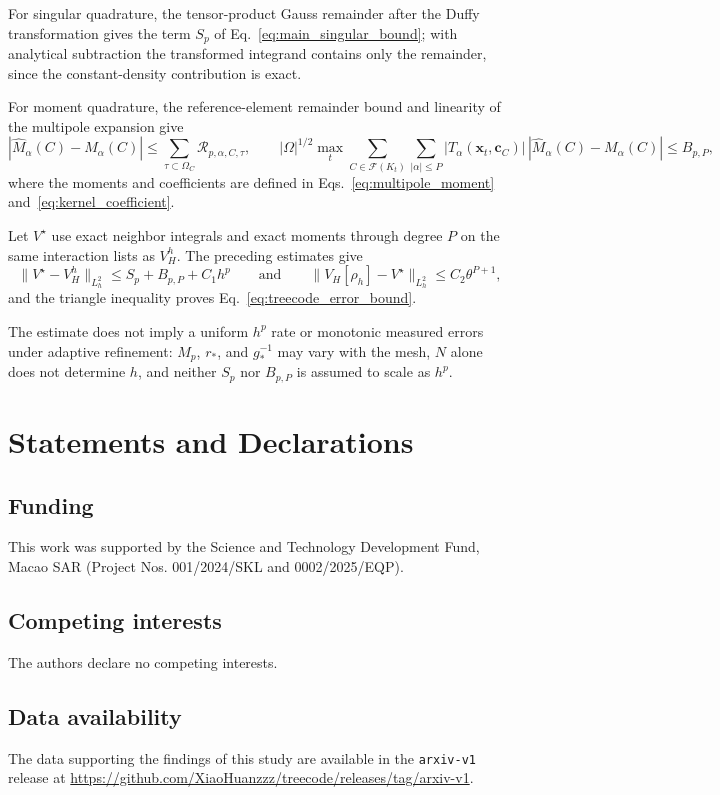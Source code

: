 \documentclass[a4paper,pdflatex,sn-mathphys-num]{sn-jnl}
\theoremstyle{thmstyleone}
\begin{document}
For singular quadrature, the tensor-product Gauss remainder after the Duffy transformation \cite{Duffy1982,NISTDLMFQuadrature} gives the term $S_p$ of Eq.~\eqref{eq:main_singular_bound}; with analytical subtraction the transformed integrand contains only the remainder, since the constant-density contribution is exact.

For moment quadrature, the reference-element remainder bound and linearity of the multipole expansion give
\[
\left|\widehat M_\alpha(C)-M_\alpha(C)\right|
\le
\sum_{\tau\subset\Omega_C}\mathcal R_{p,\alpha,C,\tau},
\qquad
|\Omega|^{1/2}\max_t
\sum_{C\in\mathcal F(K_t)}\sum_{|\alpha|\le P}
|T_\alpha(\mathbf x_t,\mathbf c_C)|
\,|\widehat M_\alpha(C)-M_\alpha(C)|
\le B_{p,P},
\]
where the moments and coefficients are defined in Eqs.~\eqref{eq:multipole_moment} and~\eqref{eq:kernel_coefficient}.

Let $V^\star$ use exact neighbor integrals and exact moments through degree $P$ on the same interaction lists as $V_H^h$. The preceding estimates give
\[
\|V^\star-V_H^h\|_{L_h^2}\le S_p+B_{p,P}+C_1h^p
\qquad\text{and}\qquad
\|V_H[\rho_h]-V^\star\|_{L_h^2}\le C_2\theta^{P+1},
\]
and the triangle inequality proves Eq.~\eqref{eq:treecode_error_bound}.

The estimate does not imply a uniform $h^p$ rate or monotonic measured errors under adaptive refinement: $M_p$, $r_*$, and $g_*^{-1}$ may vary with the mesh, $N$ alone does not determine $h$, and neither $S_p$ nor $B_{p,P}$ is assumed to scale as $h^p$.

\backmatter

\section*{Statements and Declarations}

\subsection*{Funding}
This work was supported by the Science and Technology Development Fund,
Macao SAR (Project Nos. 001/2024/SKL and 0002/2025/EQP).

\subsection*{Competing interests}
The authors declare no competing interests.

\subsection*{Data availability}
The data supporting the findings of this study are available in the
\texttt{arxiv-v1} release at
\url{https://github.com/XiaoHuanzzz/treecode/releases/tag/arxiv-v1}.
\end{document}
